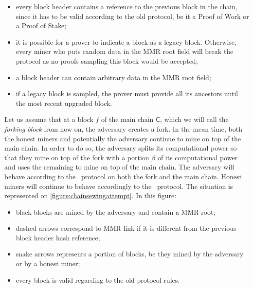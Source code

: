       \begin{itemize}
        \item every block header contains a reference to the previous block in the chain, since it has to be valid according to the old protocol, be it a Proof of Work or a Proof of Stake;
        \item it is possible for a prover to indicate a block as a legacy block. Otherwise, every miner who puts random data in the MMR root field will break the protocol as no proofs sampling this block would be accepted;
        \item a block header can contain arbitrary data in the MMR root field;
        \item if a legacy block is sampled, the prover must provide all its ancestors until the most recent upgraded block.
      \end{itemize}
      
      Let us assume that at a block \(f\) of the main chain \(\mathsf{C}\), which we will call the \textit{forking block} from now on, the adversary creates a fork. In the mean time, both the honest miners and potentially the adversary continue to mine on top of the main chain. In order to do so, the adversary splits its computational power so that they mine on top of the fork with a portion \(\beta\) of its computational power and uses the remaining to mine on top of the main chain. The adversary will behave according to the \FC\ protocol on both the fork and the main chain. Honest miners will continue to behave accordingly to the \FC\ protocol. The situation is represented on \autoref{figure:chainsewingattempt}. In this figure:
      
      \begin{itemize}
        \item black blocks are mined by the adversary and contain a MMR root;
        \item dashed arrows correspond to MMR link if it is different from the previous block header hash reference;
        \item snake arrows represents a portion of blocks, be they mined by the adversary or by a honest miner;
        \item every block is valid regarding to the old protocol rules.
      \end{itemize}
    
